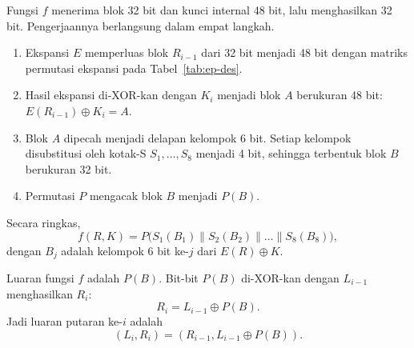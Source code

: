 Fungsi $f$ menerima blok 32 bit dan kunci internal 48 bit, lalu menghasilkan
32 bit. Pengerjaannya berlangsung dalam empat langkah.
\begin{enumerate}
    \item Ekspansi $E$ memperluas blok $R_{i-1}$ dari 32 bit menjadi 48 bit
    dengan matriks permutasi ekspansi pada Tabel~\ref{tab:ep-des}.
    \item Hasil ekspansi di-XOR-kan dengan $K_i$ menjadi blok $A$ berukuran
    48 bit: $E(R_{i-1}) \oplus K_i = A$.
    \item Blok $A$ dipecah menjadi delapan kelompok 6 bit. Setiap kelompok
    disubstitusi oleh kotak-S $S_1, \dots, S_8$ menjadi 4 bit, sehingga
    terbentuk blok $B$ berukuran 32 bit.
    \item Permutasi $P$ mengacak blok $B$ menjadi $P(B)$.
\end{enumerate}

Secara ringkas,
\begin{equation}
f(R, K) = P\bigl( S_1(B_1) \parallel S_2(B_2) \parallel \dots \parallel S_8(B_8) \bigr),
\label{eq:des-f}
\end{equation}
dengan $B_j$ adalah kelompok 6 bit ke-$j$ dari $E(R) \oplus K$.

Luaran fungsi $f$ adalah $P(B)$. Bit-bit $P(B)$ di-XOR-kan dengan $L_{i-1}$
menghasilkan $R_i$:
\[
R_i = L_{i-1} \oplus P(B).
\]
Jadi luaran putaran ke-$i$ adalah
\[
(L_i, R_i) = (R_{i-1}, L_{i-1} \oplus P(B)).
\]

